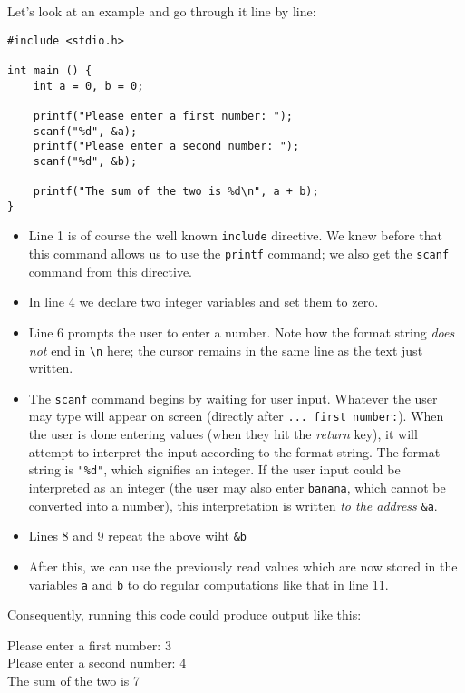 Let's look at an example and go through it line by line:
\begin{codebox}[interactiveSum.c]
\begin{verbatim}
#include <stdio.h>

int main () {
    int a = 0, b = 0;
    
    printf("Please enter a first number: ");
    scanf("%d", &a);
    printf("Please enter a second number: ");
    scanf("%d", &b);
    
    printf("The sum of the two is %d\n", a + b);
}
\end{verbatim}
\end{codebox}
\begin{itemize}
\setlength\itemsep{0pt}
\item Line 1 is of course the well known \texttt{include} directive. We knew before that this command allows us to use the \texttt{printf} command; 
	we also get the \texttt{scanf} command from this directive.
\item In line 4 we declare two integer variables and set them to zero.
\item Line 6 prompts the user to enter a number. Note how the format string \emph{does not} end in \texttt{\textbackslash n} here; 
	the cursor remains in the same line as the text just written.
\item The \texttt{scanf} command begins by waiting for user input. Whatever the user may type will appear on screen (directly after \texttt{... first number:}).
	When the user is done entering values (\ie when they hit the \emph{return} key), it will attempt to interpret the input according to the format string.
	The format string is \texttt{"\%d"}, which signifies an integer. If the user input could be interpreted as an integer (the user may also enter \texttt{banana}, 
	which cannot be converted into a number), this interpretation is written \emph{to the address} \texttt{\&a}.
\item Lines 8 and 9 repeat the above wiht \texttt{\&b}
\item After this, we can use the previously read values which are now stored in the variables \texttt{a} and \texttt{b} to do regular computations like that in line 11.
\end{itemize}

Consequently, running this code could produce output like this:
\begin{cmdbox}
Please enter a first number: 3 \\
Please enter a second number: 4 \\
The sum of the two is 7
\end{cmdbox}


